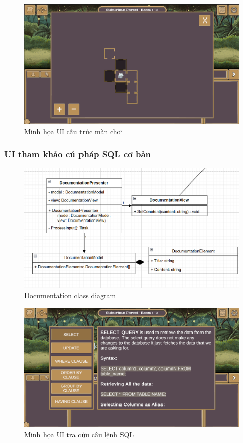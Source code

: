\begin{figure}[H]
	\centering
	\includegraphics[width=13cm]{Images/LevelStructureUI.png}
	\vspace{0.5cm}
	\caption{Minh họa UI cấu trúc màn chơi}
\end{figure}

\subsubsection{UI tham khảo cú pháp SQL cơ bản}
\begin{figure}[H]
	\centering
	\includegraphics[width=13cm]{Images/DocumentationView.png}
	\vspace{0.5cm}
	\caption{Documentation class diagram}
\end{figure}

\begin{figure}[H]
	\centering
	\includegraphics[width=13cm]{Images/DocumentationUI.png}
	\vspace{0.5cm}
	\caption{Minh họa UI tra cứu câu lệnh SQL}
\end{figure}


